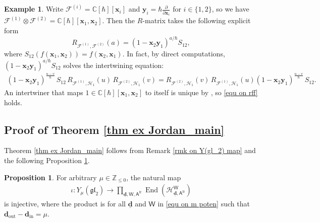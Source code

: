 \documentclass[10pt]{amsart}
\theoremstyle{definition}
\newtheorem{Proposition}[Theorem]{Proposition}
\newtheorem{Example}[Theorem]{Example}
\numberwithin{equation}{section}
\newcommand{\bC}{\mathbb{C}}
\newcommand{\bZ}{\mathbb{Z}}
\newcommand{\bd}{\mathbf{d}}
\newcommand{\cH}{\mathcal{H}}
\newcommand{\sA}{\mathsf{A}}
\newcommand{\sW}{\mathsf{W}}
\newcommand{\End}{\operatorname{End}}
\newcommand{\In}{\operatorname{in}}
\newcommand{\Out}{\operatorname{out}}
\begin{document}
\begin{Example}
Write $\mathcal F^{(i)}=\bC[\hbar][\mathbf x_i]$ and $\mathbf y_i=\hbar\frac{\partial}{\partial\mathbf x_i}$ for $i\in \{1,2\}$, so we have $ \mathcal F^{(1)}\otimes\mathcal F^{(2)}=\bC[\hbar][\mathbf x_1,\mathbf x_2]$. Then the $R$-matrix takes the following explicit form
\begin{equation}\label{equ on rff}
    R_{\mathcal F^{(1)},\mathcal F^{(2)}}(a)=\left(1-\mathbf x_2\mathbf y_1\right)^{a/\hbar}S_{12},
\end{equation}
where $S_{12}(f(\mathbf x_1,\mathbf x_2))=f(\mathbf x_2,\mathbf x_1)$. 
In fact, by direct computations, $\left(1-\mathbf x_2\mathbf y_1\right)^{a/\hbar}S_{12}$ solves the intertwining equation:
\begin{align*}
    \left(1-\mathbf x_2\mathbf y_1\right)^{\frac{u-v}{\hbar}}\,S_{12}\,R_{\mathcal F^{(1)},\mathcal H_1}(u)\,R_{\mathcal F^{(2)},\mathcal H_1}(v)=R_{\mathcal F^{(2)},\mathcal H_1}(v)\,R_{\mathcal F^{(1)},\mathcal H_1}(u)\left(1-\mathbf x_2\mathbf y_1\right)^{\frac{u-v}{\hbar}}\,S_{12}.
\end{align*}
An intertwiner that maps $1\in \bC[\hbar][\mathbf x_1,\mathbf x_2]$ to itself is unique by \cite[Thm.~5.2\,(i)]{HZ}, so \eqref{equ on rff} holds.
\end{Example}

\subsection{Proof of Theorem \ref{thm ex Jordan_main}}\label{sect on proof of thm jordan}

Theorem \ref{thm ex Jordan_main} follows from Remark \ref{rmk on Y(gl_2) map} and the following Proposition \ref{prop embed Y into end}.

\begin{Proposition}\label{prop embed Y into end}
For arbitrary $\mu\in \bZ_{\leqslant 0}$, the natural map 
\begin{align*}
    \iota\colon Y_{\mu}(\mathfrak{gl}_2)\to \prod_{\underline{\bd},\sW,\sA^{\mathrm{fr}} }\End(\cH^{\sW}_{\underline{\bd},\sA^{\mathrm{fr}}})
\end{align*}
is injective, where the product is for all $\underline{\bd}$ and $\sW$ in \eqref{equ on m poten} such that $\bd_{\Out}-\bd_{\In}=\mu$.
\end{Proposition}
\end{document}
